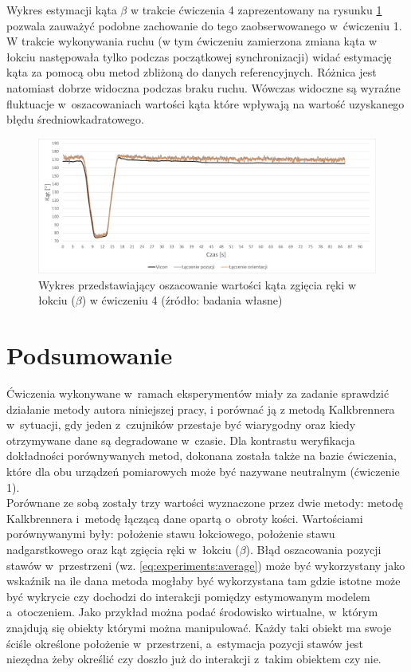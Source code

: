 Wykres estymacji kąta $\beta$ w trakcie ćwiczenia 4 zaprezentowany na rysunku \ref{fig:experiments:fourth:angle} pozwala zauważyć podobne zachowanie do tego zaobserwowanego w~ćwiczeniu 1. W trakcie wykonywania ruchu (w tym ćwiczeniu zamierzona zmiana kąta w łokciu następowała tylko podczas początkowej synchronizacji) widać estymację kąta za pomocą obu metod zbliżoną do danych referencyjnych. Różnica jest natomiast dobrze widoczna podczas braku ruchu. Wówczas widoczne są wyraźne fluktuacje w~oszacowaniach wartości kąta które wpływają na wartość uzyskanego błędu średniowkadratowego.
			
\begin{savenotes}
	\begin{figure}[!htb]
		\centering
		\includegraphics[width=\textwidth]{images/400/angle.png}
		\caption{Wykres przedstawiający oszacowanie wartości kąta zgięcia ręki w łokciu ($\beta$) w ćwiczeniu 4 (źródło: badania własne)}
		\label{fig:experiments:fourth:angle}
	\end{figure}
\end{savenotes}																					
\section{Podsumowanie}
																								
Ćwiczenia wykonywane w~ramach eksperymentów miały za zadanie sprawdzić działanie metody autora niniejszej pracy, i porównać ją z metodą Kalkbrennera w~sytuacji, gdy jeden z~czujników przestaje być wiarygodny oraz kiedy otrzymywane dane są degradowane w~czasie. Dla kontrastu weryfikacja dokładności porównywanych metod, dokonana została także na bazie ćwiczenia, które dla obu urządzeń pomiarowych może być nazywane neutralnym (ćwiczenie 1).\\
																								
Porównane ze sobą zostały trzy wartości wyznaczone przez dwie metody: metodę Kalkbrennera i~metodę łączącą dane opartą o~obroty kości. Wartościami porównywanymi były: położenie stawu łokciowego, położenie stawu nadgarstkowego oraz kąt zgięcia ręki w~łokciu ($\beta$). Błąd oszacowania pozycji stawów w~przestrzeni (wz. \ref{eq:experiments:average}) może być wykorzystany jako wskaźnik na ile dana metoda mogłaby być wykorzystana tam gdzie istotne może być wykrycie czy dochodzi do interakcji pomiędzy estymowanym modelem a~otoczeniem. Jako przykład można podać środowisko wirtualne, w~którym znajdują się obiekty którymi można manipulować. Każdy taki obiekt ma swoje ściśle określone położenie w~przestrzeni, a~estymacja pozycji stawów jest niezędna żeby określić czy doszło już do interakcji z~takim obiektem czy nie.
																								 
